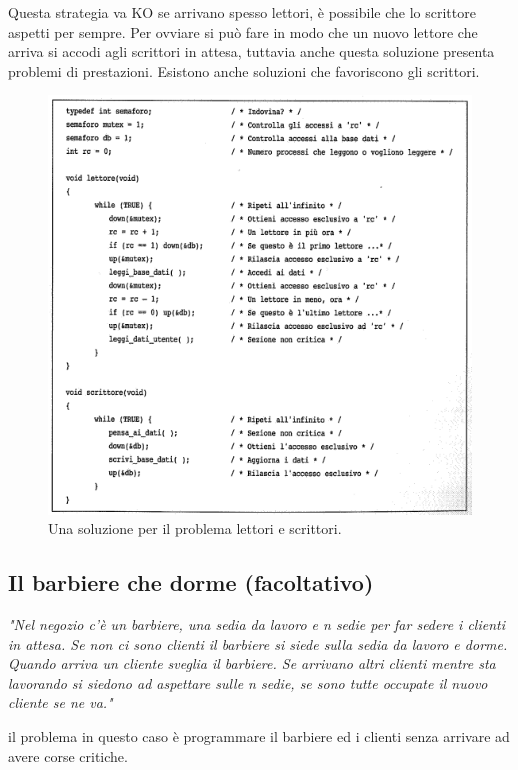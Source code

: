 Questa strategia va KO se arrivano spesso lettori, è possibile che lo scrittore aspetti per sempre. Per ovviare si può fare in modo che un nuovo lettore che arriva si accodi agli scrittori in attesa, tuttavia anche questa soluzione presenta problemi di prestazioni. Esistono anche soluzioni che favoriscono gli scrittori.

\begin{figure}[H]
    \centering
    \includegraphics[width=1\linewidth]{assets/soluzionelettoriscrittori6.png}
    \caption{Una soluzione per il problema lettori e scrittori.}
    \label{soluzionelettoriscrittori}
\end{figure}


\subsection{Il barbiere che dorme (facoltativo)}

\textit{"Nel negozio c'è un barbiere, una sedia da lavoro e n sedie per far sedere i clienti in attesa. Se non ci sono clienti il barbiere si siede sulla sedia da lavoro e dorme. Quando arriva un cliente sveglia il barbiere. Se arrivano altri clienti mentre sta lavorando si siedono ad aspettare sulle n sedie, se sono tutte occupate il nuovo cliente se ne va."}

il problema in questo caso è programmare il barbiere ed i clienti senza arrivare ad avere corse critiche.

